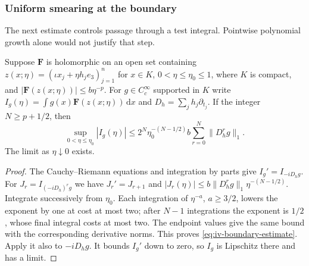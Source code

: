 \documentclass[11pt,letterpaper,reqno]{amsart}
\makeatletter
\theoremstyle{definition}
\newcommand{\ms@minorstart}{%
  \pushQED{\qed}\renewcommand{\qedsymbol}{$\blacksquare$}}
\newenvironment{lemma}[1][]{\ms@minorstart\ms@lemma[#1]}
  {\popQED\endms@lemma}
\theoremstyle{remark}
\makeatother
\begin{document}
\subsubsection{Uniform smearing at the boundary}

The next estimate controls passage through a test integral.
Pointwise polynomial growth alone would not justify that step.

\begin{lemma}\label{IV-76-23}
Suppose $\mathbf F$ is holomorphic on an open set containing
$z(x;\eta)=(\iota x_j+\eta h_je_3)_{j=1}^n$ for
$x\in K$, $0<\eta\le\eta_0\le1$, where $K$ is compact,
and $|\mathbf F(z(x;\eta))|\le b\eta^{-p}$.
For $g\in C_c^\infty$ supported in $K$ write
$I_g(\eta)=\int g(x)\mathbf F(z(x;\eta))\,\mathrm{d}x$
and $D_h=\sum_jh_j\partial_{t_j}$. If the integer
$N\ge p+1/2$, then
\begin{equation}\label{eq:iv-boundary-estimate}
 \sup_{0<\eta\le\eta_0}|I_g(\eta)|
       \le2^N\eta_0^{-(N-1/2)}b
                                 \sum_{r=0}^N\|D_h^rg\|_1.
\end{equation}
The limit as $\eta\downarrow0$ exists.
\end{lemma}
\begin{proof}
The Cauchy--Riemann equations and integration by parts give
$I_g'=I_{-iD_hg}$. For $J_r=I_{(-iD_h)^rg}$ we have
$J_r'=J_{r+1}$ and
$|J_r(\eta)|\le b\|D_h^rg\|_1\eta^{-(N-1/2)}$.
Integrate successively from $\eta_0$. Each integration of
$\eta^{-a}$, $a\ge3/2$, lowers the exponent by one at cost
at most two; after $N-1$ integrations the exponent is $1/2$,
whose final integral costs at most two. The endpoint values
give the same bound with the corresponding derivative norms.
This proves \eqref{eq:iv-boundary-estimate}. Apply it also to
$-iD_hg$. It bounds $I_g'$ down to zero, so $I_g$ is
Lipschitz there and has a limit.
\end{proof}
\end{document}

